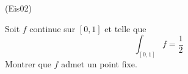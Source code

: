 \begin{tiny}(Eis02)\end{tiny}
Soit $f$ continue sur $[0,1]$ et telle que
\[\int_{[0,1]}f = \frac{1}{2}\]
Montrer que $f$ admet un point fixe.